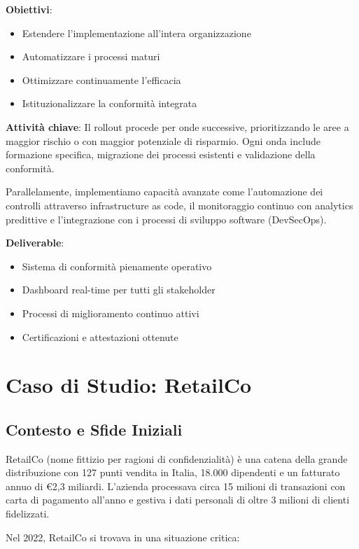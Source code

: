 \textbf{Obiettivi}:
\begin{itemize}
    \item Estendere l'implementazione all'intera organizzazione
    \item Automatizzare i processi maturi
    \item Ottimizzare continuamente l'efficacia
    \item Istituzionalizzare la conformità integrata
\end{itemize}

\textbf{Attività chiave}:
Il rollout procede per onde successive, prioritizzando le aree a maggior rischio o con maggior potenziale di risparmio. Ogni onda include formazione specifica, migrazione dei processi esistenti e validazione della conformità.

Parallelamente, implementiamo capacità avanzate come l'automazione dei controlli attraverso infrastructure as code, il monitoraggio continuo con analytics predittive e l'integrazione con i processi di sviluppo software (DevSecOps).

\textbf{Deliverable}:
\begin{itemize}
    \item Sistema di conformità pienamente operativo
    \item Dashboard real-time per tutti gli stakeholder
    \item Processi di miglioramento continuo attivi
    \item Certificazioni e attestazioni ottenute
\end{itemize}

\section{Caso di Studio: RetailCo}
\label{sec:4.7_caso_studio}

\subsection{Contesto e Sfide Iniziali}
\label{subsec:4.7.1_contesto}

RetailCo (nome fittizio per ragioni di confidenzialità) è una catena della grande distribuzione con 127 punti vendita in Italia, 18.000 dipendenti e un fatturato annuo di €2,3 miliardi. L'azienda processava circa 15 milioni di transazioni con carta di pagamento all'anno e gestiva i dati personali di oltre 3 milioni di clienti fidelizzati.

Nel 2022, RetailCo si trovava in una situazione critica:

